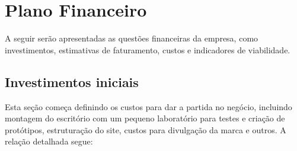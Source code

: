\section{Plano Financeiro}

A seguir serão apresentadas as questões financeiras da empresa, como investimentos, estimativas de faturamento, custos e 
indicadores de viabilidade.

\subsection{Investimentos iniciais}

Esta seção começa definindo os custos para dar a partida no negócio, incluindo montagem do escritório com um pequeno laboratório para testes e criação de protótipos, estruturação do site, custos para divulgação da marca e outros. A relação detalhada segue:


